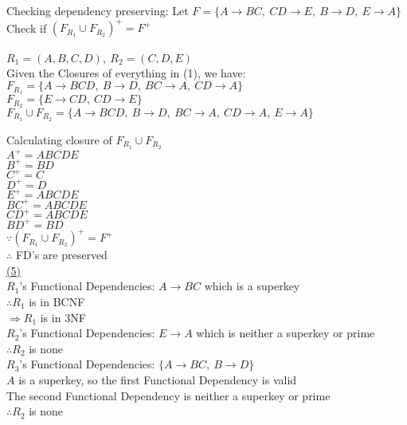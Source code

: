 \documentclass[12pt]{article}
\begin{document}
Checking dependency preserving: Let $F=\{A\rightarrow BC,\ CD \rightarrow E,\ B \rightarrow D,\ E \rightarrow A\}$
Check if $(F_{R_1} \cup F_{R_2})^+ = F^+$\\\\

$R_1 = (A, B, C, D),\ R_2 = (C, D, E)$\\

Given the Closures of everything in (1), we have:\\
$F_{R_1} = \{A \rightarrow BCD,\ B \rightarrow D,\ BC \rightarrow A,\ CD \rightarrow A\}$\\
$F_{R_2} = \{E \rightarrow CD,\ CD \rightarrow E\}$\\

$F_{R_1} \cup F_{R_2} = \{A \rightarrow BCD,\ B \rightarrow D,\ BC \rightarrow A,\ CD \rightarrow A,\ E \rightarrow A\}$
\newpage

Calculating closure of $F_{R_1} \cup F_{R_2}$\\

$A^+ =ABCDE$\\
${B}^+=BD$\\
${C}^+=C$\\
${D}^+=D$\\
${E}^+=ABCDE$\\
${BC}^+= ABCDE$\\
${CD}^+= ABCDE$\\
${BD}^+=BD$\\

$\because (F_{R_1} \cup F_{R_2})^+ = F^+$\\
$\therefore$ FD's are preserved\\

\noindent \hyperlink{toc}{\hypertarget{6.5}{(5)}}\\
$R_1$'s Functional Dependencies: $A\rightarrow BC$ which is a superkey\\
$\therefore R_1$ is in BCNF\\
$\Longrightarrow R_1$ is in 3NF\\

$R_2$'s Functional Dependencies: $E\rightarrow A$ which is neither a superkey or prime\\
$\therefore R_2$ is none\\

$R_3$'s Functional Dependencies: $\{A\rightarrow BC,\ B \rightarrow D \}$\\
$A$ is a superkey, so the first Functional Dependency is valid\\
The second Functional Dependency is neither a superkey or prime\\
$\therefore R_2$ is none\\
\end{document}
